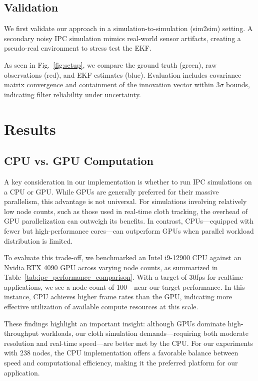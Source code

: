 \subsection{Validation}
We first validate our approach in a simulation-to-simulation (sim2sim) setting. A secondary noisy IPC simulation mimics real-world sensor artifacts, creating a pseudo-real environment to stress test the EKF.

As seen in Fig.~\ref{fig:setup}, we compare the ground truth (green), raw observations (red), and EKF estimates (blue). Evaluation includes covariance matrix convergence and containment of the innovation vector within $3\sigma$ bounds, indicating filter reliability under uncertainty.

\section{Results}
\subsection{CPU vs. GPU Computation}

A key consideration in our implementation is whether to run IPC simulations on a CPU or GPU. While GPUs are generally preferred for their massive parallelism, this advantage is not universal. For simulations involving relatively low node counts, such as those used in real-time cloth tracking, the overhead of GPU parallelization can outweigh its benefits. In contrast, CPUs—equipped with fewer but high-performance cores—can outperform GPUs when parallel workload distribution is limited.

To evaluate this trade-off, we benchmarked an Intel i9-12900 CPU against an Nvidia RTX 4090 GPU across varying node counts, as summarized in Table~\ref{tab:ipc_performance_comparison}. With a target of 30fps for realtime applications, we see a node count of 100—near our target performance. In this instance, CPU achieves higher frame rates than the GPU, indicating more effective utilization of available compute resources at this scale.

These findings highlight an important insight: although GPUs dominate high-throughput workloads, our cloth simulation demands—requiring both moderate resolution and real-time speed—are better met by the CPU. For our experiments with 238 nodes, the CPU implementation offers a favorable balance between speed and computational efficiency, making it the preferred platform for our application.

